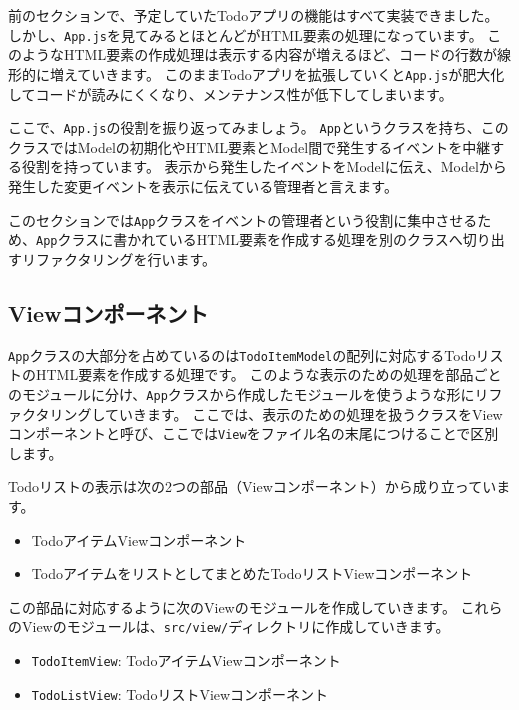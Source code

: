 前のセクションで、予定していたTodoアプリの機能はすべて実装できました。
しかし、\texttt{App.js}を見てみるとほとんどがHTML要素の処理になっています。
このようなHTML要素の作成処理は表示する内容が増えるほど、コードの行数が線形的に増えていきます。
このままTodoアプリを拡張していくと\texttt{App.js}が肥大化してコードが読みにくくなり、メンテナンス性が低下してしまいます。

ここで、\texttt{App.js}の役割を振り返ってみましょう。
\texttt{App}というクラスを持ち、このクラスではModelの初期化やHTML要素とModel間で発生するイベントを中継する役割を持っています。
表示から発生したイベントをModelに伝え、Modelから発生した変更イベントを表示に伝えている管理者と言えます。

このセクションでは\texttt{App}クラスをイベントの管理者という役割に集中させるため、\texttt{App}クラスに書かれているHTML要素を作成する処理を別のクラスへ切り出すリファクタリングを行います。

\hypertarget{component}{%
\subsection{Viewコンポーネント}\label{component}}

\texttt{App}クラスの大部分を占めているのは\texttt{TodoItemModel}の配列に対応するTodoリストのHTML要素を作成する処理です。
このような表示のための処理を部品ごとのモジュールに分け、\texttt{App}クラスから作成したモジュールを使うような形にリファクタリングしていきます。
ここでは、表示のための処理を扱うクラスをViewコンポーネントと呼び、ここでは\texttt{View}をファイル名の末尾につけることで区別します。

Todoリストの表示は次の2つの部品（Viewコンポーネント）から成り立っています。

\begin{itemize}
\item
  TodoアイテムViewコンポーネント
\item
  TodoアイテムをリストとしてまとめたTodoリストViewコンポーネント
\end{itemize}

この部品に対応するように次のViewのモジュールを作成していきます。
これらのViewのモジュールは、\texttt{src/view/}ディレクトリに作成していきます。

\begin{itemize}
\item
  \texttt{TodoItemView}: TodoアイテムViewコンポーネント
\item
  \texttt{TodoListView}: TodoリストViewコンポーネント
\end{itemize}

